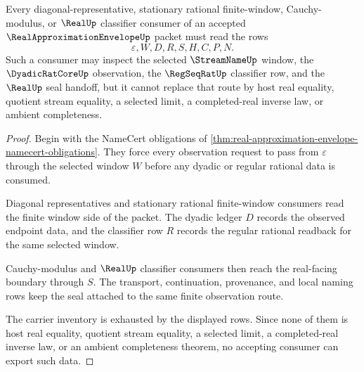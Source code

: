 \begin{theorem}
\label{thm:real-approximation-envelope-consumer-boundary}
Every diagonal-representative, stationary rational finite-window, Cauchy-modulus, or $\RealUp$ classifier consumer of an accepted $\RealApproximationEnvelopeUp$ packet must read the rows
$$
\varepsilon,W,D,R,S,H,C,P,N.
$$
Such a consumer may inspect the selected $\StreamNameUp$ window, the $\DyadicRatCoreUp$ observation, the $\RegSeqRatUp$ classifier row, and the $\RealUp$ seal handoff, but it cannot replace that route by host real equality, quotient stream equality, a selected limit, a completed-real inverse law, or ambient completeness.
\end{theorem}
\begin{proof}
Begin with the NameCert obligations of \autoref{thm:real-approximation-envelope-namecert-obligations}. They force every observation request to pass from $\varepsilon$ through the selected window $W$ before any dyadic or regular rational data is consumed.

Diagonal representatives and stationary rational finite-window consumers read the finite window side of the packet. The dyadic ledger $D$ records the observed endpoint data, and the classifier row $R$ records the regular rational readback for the same selected window.

Cauchy-modulus and $\RealUp$ classifier consumers then reach the real-facing boundary through $S$. The transport, continuation, provenance, and local naming rows keep the seal attached to the same finite observation route.

The carrier inventory is exhausted by the displayed rows. Since none of them is host real equality, quotient stream equality, a selected limit, a completed-real inverse law, or an ambient completeness theorem, no accepting consumer can export such data.
\end{proof}


